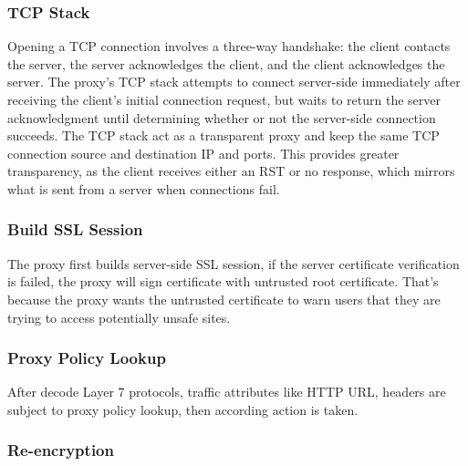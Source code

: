 \subsubsection*{\hypertarget{link:TCP Stack}{TCP Stack}}
\label{sec:appendix_e:sequence:proxy:TCP}

Opening a TCP connection involves a three-way handshake: the client contacts the server, the server acknowledges the client, and the client acknowledges the server. 
The proxy’s TCP stack attempts to connect server-side immediately after receiving the client’s initial connection request, 
but waits to return the server acknowledgment until determining whether or not the server-side connection succeeds. 
The TCP stack act as a transparent proxy and keep the same TCP connection source and destination IP and ports. 
This provides greater transparency, as the client receives either an RST or no response, which mirrors what is sent from a server when connections fail.

\subsubsection*{\hypertarget{link:Build SSL Session}{Build SSL Session}}
\label{sec:appendix_e:sequence:proxy:build}

The proxy first builds server-side SSL session, if the server certificate verification is failed, the proxy will sign certificate with untrusted root certificate. That’s because the proxy wants the untrusted certificate to warn users that they are trying to access potentially unsafe sites.

\subsubsection*{\hypertarget{link:Proxy Policy Lookup}{Proxy Policy Lookup}}
\label{sec:appendix_e:sequence:proxy:lookup}

After decode Layer 7 protocols, traffic attributes like HTTP URL, headers are subject to proxy policy lookup, then according action is taken.

\subsubsection*{\hypertarget{link:Re-encryption}{Re-encryption}}
\label{sec:appendix_e:sequence:proxy:re-encryption}

